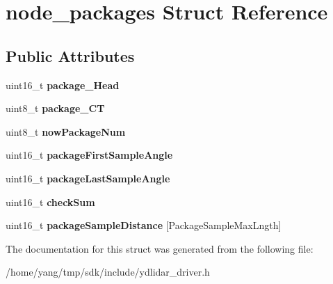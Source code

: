 \hypertarget{structnode__packages}{}\section{node\+\_\+packages Struct Reference}
\label{structnode__packages}
\subsection*{Public Attributes}
\begin{DoxyCompactItemize}
\item 
uint16\+\_\+t {\bfseries package\+\_\+\+Head}\hypertarget{structnode__packages_a1ed3121fde426c16fe5b5e8fac3c5431}{}\label{structnode__packages_a1ed3121fde426c16fe5b5e8fac3c5431}

\item 
uint8\+\_\+t {\bfseries package\+\_\+\+CT}\hypertarget{structnode__packages_a3365c5aeb9c44c7e7645fd056669437b}{}\label{structnode__packages_a3365c5aeb9c44c7e7645fd056669437b}

\item 
uint8\+\_\+t {\bfseries now\+Package\+Num}\hypertarget{structnode__packages_a7fc929fc56aa18d2229343e1c4079477}{}\label{structnode__packages_a7fc929fc56aa18d2229343e1c4079477}

\item 
uint16\+\_\+t {\bfseries package\+First\+Sample\+Angle}\hypertarget{structnode__packages_a48780f8343011c26cfa69bc0bcfb98d0}{}\label{structnode__packages_a48780f8343011c26cfa69bc0bcfb98d0}

\item 
uint16\+\_\+t {\bfseries package\+Last\+Sample\+Angle}\hypertarget{structnode__packages_a767062914a931ffc4ffc62292bdca610}{}\label{structnode__packages_a767062914a931ffc4ffc62292bdca610}

\item 
uint16\+\_\+t {\bfseries check\+Sum}\hypertarget{structnode__packages_a8ccc72e7cab7a3d4765ab5cc20097d41}{}\label{structnode__packages_a8ccc72e7cab7a3d4765ab5cc20097d41}

\item 
uint16\+\_\+t {\bfseries package\+Sample\+Distance} \mbox{[}Package\+Sample\+Max\+Lngth\mbox{]}\hypertarget{structnode__packages_a82b44c4cd7adf4f3c7923112b5438b0f}{}\label{structnode__packages_a82b44c4cd7adf4f3c7923112b5438b0f}

\end{DoxyCompactItemize}


The documentation for this struct was generated from the following file\+:\begin{DoxyCompactItemize}
\item 
/home/yang/tmp/sdk/include/ydlidar\+\_\+driver.\+h\end{DoxyCompactItemize}
